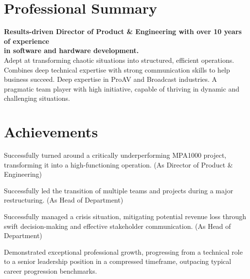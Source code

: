 \documentclass[]{private}
\begin{document}
\begin{paracol}{2}
    \switchcolumn[0]
    \section{Professional Summary}
    \textbf{Results-driven Director of Product \& Engineering with over 10 years of experience \\ in software and hardware development.} \\[3pt]
    Adept at transforming chaotic situations into structured, efficient operations. Combines deep technical expertise with strong communication skills to help business succeed. Deep expertise in ProAV and Broadcast industries.  A pragmatic team player with high initiative, capable of thriving in dynamic and challenging situations.
    \section{Achievements} 
    \begin{tightemize}
        \item Successfully turned around a critically underperforming MPA1000 project, transforming it into a high-functioning operation. (As Director of Product \& Engineering)
        \item Successfully led the transition of multiple teams and projects during a major restructuring. (As Head of Department)
        \item Successfully managed a crisis situation, mitigating potential revenue loss through swift decision-making and effective stakeholder communication. (As Head of Department)
        \item Demonstrated exceptional professional growth, progressing from a technical role to a senior leadership position in a compressed timeframe, outpacing typical career progression benchmarks.
    \end{tightemize}

\end{paracol}
\end{document}
